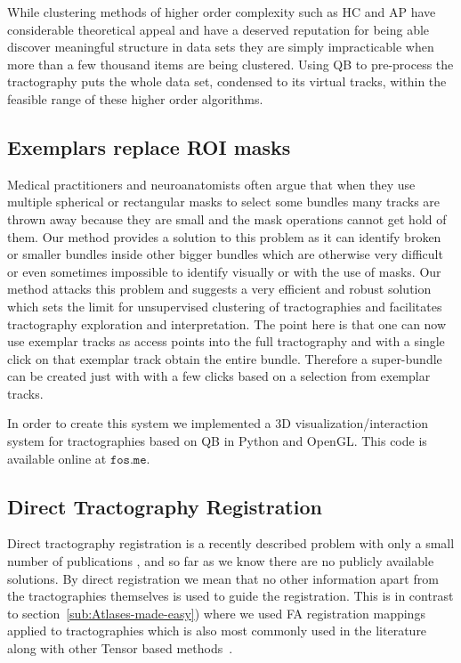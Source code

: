 \documentclass{bioinfo}
\begin{document}
While clustering methods of higher order complexity such as HC and AP
have considerable theoretical appeal and have a deserved reputation for
being able discover meaningful structure in data sets they are simply
impracticable when more than a few thousand items are being
clustered. Using QB to pre-process the tractography puts the whole data
set, condensed to its virtual tracks, within the feasible range of these
higher order algorithms.

\subsection{Exemplars replace ROI masks\label{sub:exemplars_vs_ROIs}}

Medical practitioners and neuroanatomists often argue that when they use
multiple spherical or rectangular masks to select some bundles many
tracks are thrown away because they are small and the mask operations
cannot get hold of them. Our method provides a solution to this problem
as it can identify broken or smaller bundles inside other bigger bundles
which are otherwise very difficult or even sometimes impossible to
identify visually or with the use of masks. Our method attacks this
problem and suggests a very efficient and robust solution which sets the
limit for unsupervised clustering of tractographies and facilitates
tractography exploration and interpretation. The point here is that one
can now use exemplar tracks as access points into the full tractography
and with a single click on that exemplar track obtain the entire bundle.
Therefore a super-bundle can be created just with with a few clicks
based on a selection from exemplar tracks.

In order to create this system we implemented a 3D
visualization/interaction system for tractographies based on QB in
Python and OpenGL. This code is available online at $\texttt{fos.me}$.


\subsection{Direct Tractography Registration\label{sub:direct_registration}}

Direct tractography registration is a recently described problem with
only a small number of publications \cite{leemans2006multiscale,
  mayer2008bundles, mayerdirect, mayer2011supervised,
  durrleman2010registration, zvitia2008adaptive, Zvitia2010,
  ZiyanMICCAI07}, and so far as we know there are no publicly available
solutions. By direct registration we mean that no other information
apart from the tractographies themselves is used to guide the
registration. This is in contrast to
section~\ref{sub:Atlases-made-easy}) where we used FA registration
mappings applied to tractographies which is also most commonly used in
the literature along with other Tensor based
methods~\cite{goh2006algebraic}.
\end{document}
